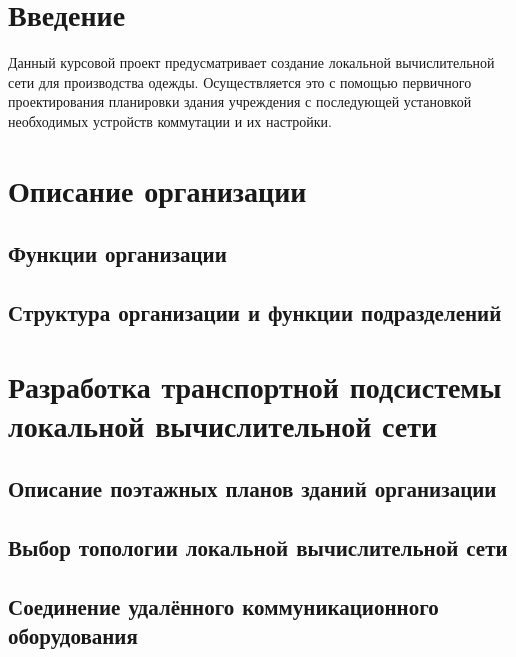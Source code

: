 \documentclass[a4paper,14pt,russian]{article}
\begin{document}
\clearpage

\tableofcontents
\clearpage

\section*{Введение}
Данный курсовой проект предусматривает создание локальной вычислительной сети для производства одежды. Осуществляется это с помощью первичного проектирования планировки здания учреждения с последующей установкой необходимых устройств коммутации и их настройки.
\clearpage

\section{Описание организации}

\subsection{Функции организации}


\subsection{Структура организации и функции подразделений}


\section{Разработка транспортной подсистемы локальной вычислительной сети}

\subsection{Описание поэтажных планов зданий организации}


\subsection{Выбор топологии локальной вычислительной сети}


\subsection{Соединение удалённого коммуникационного оборудования}

\end{document}
